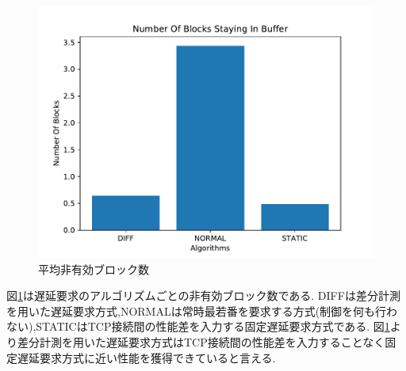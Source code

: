 \documentclass[a4j,12pt]{gradthesis_utf8}
\begin{document}
\newpage

\begin{figure}[h]
	\begin{center}
		\includegraphics[width=15cm]{figure/NumberOfBlocksStayingInBuffer.pdf}
		\caption{平均非有効ブロック数}
		\label{nsb}
	\end{center}
\end{figure}

図\ref{nsb}は遅延要求のアルゴリズムごとの非有効ブロック数である.
DIFFは差分計測を用いた遅延要求方式,NORMALは常時最若番を要求する方式(制御を何も行わない),STATICはTCP接続間の性能差を入力する固定遅延要求方式である.
図\ref{nsb}より差分計測を用いた遅延要求方式はTCP接続間の性能差を入力することなく固定遅延要求方式に近い性能を獲得できていると言える.

\newpage
\end{document}
